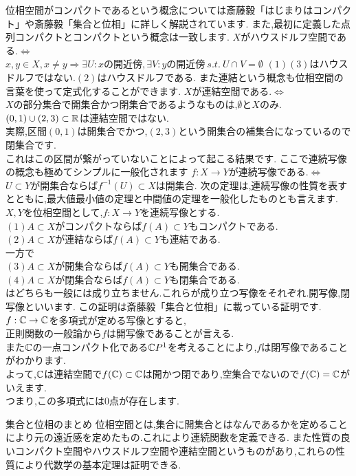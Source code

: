 位相空間がコンパクトであるという概念については斎藤毅「はじまりはコンパクト」や斎藤毅「集合と位相」に詳しく解説されています.
また,最初に定義した点列コンパクトとコンパクトという概念は一致します.
$X$がハウスドルフ空間である.$\iff$\\
$x,y \in X , x\neq y \Rightarrow \exists U:x\mbox{の開近傍} ,\exists V:y\mbox{の開近傍} \ s.t. \ U \cap V = \emptyset$
\ex
$(1)(3)$はハウスドルフではない.$(2)$はハウスドルフである.
\exx
また連結という概念も位相空間の言葉を使って定式化することができます.
$X$が連結空間である.$\iff$\\
$X$の部分集合で開集合かつ閉集合であるようなものは,$\emptyset$と$X$のみ.
\ex
$(0,1) \cup (2,3)\subset\mathbb R$は連結空間ではない.\\
実際,区間$(0,1)$は開集合でかつ,$(2,3)$という開集合の補集合になっているので閉集合です.\\
これはこの区間が繋がっていないことによって起こる結果です.
\exx
ここで連続写像の概念も極めてシンプルに一般化されます
$f:X\to Y$が連続写像である.$\iff$\\
$U \subset Y$が開集合ならば$f^{-1}(U) \subset X$は開集合.
次の定理は,連続写像の性質を表すとともに,最大値最小値の定理と中間値の定理を一般化したものとも言えます.
\thm
$X,Y$を位相空間として,$f:X\to Y$を連続写像とする.\\
$(1)$$A\subset X$がコンパクトならば$f(A)\subset Y$もコンパクトである.\\
$(2)$$A\subset X$が連結ならば$f(A)\subset Y$も連結である.\\
\thmx
\rem
一方で\\
$(3)A\subset X$が開集合ならば$f(A)\subset Y$も開集合である.\\
$(4)A\subset X$が閉集合ならば$f(A)\subset Y$も閉集合である.\\
はどちらも一般には成り立ちません.これらが成り立つ写像をそれぞれ.開写像,閉写像といいます.
\remx
\proof[位相空間論における代数学の基本定理の証明]
この証明は斎藤毅「集合と位相」に載っている証明です.\\
$f:\mathbb C \to \mathbb C$を多項式が定める写像とすると,\\
正則関数の一般論から$f$は開写像であることが言える.\\
また$\mathbb C$の一点コンパクト化である$\mathbb C P^1$を考えることにより,$f$は閉写像であることがわかります.\\
よって,$\mathbb C$は連結空間で$f(\mathbb C)\subset\mathbb C$は開かつ閉であり,空集合でないので$f(\mathbb C)=\mathbb C$がいえます.\\
つまり,この多項式には$0$点が存在します.
\proofx
\begin{itembox}[l]{集合と位相のまとめ}
位相空間とは,集合に開集合とはなんであるかを定めることにより元の遠近感を定めたもの.これにより連続関数を定義できる.
また性質の良いコンパクト空間やハウスドルフ空間や連結空間というものがあり,これらの性質により代数学の基本定理は証明できる.
\end{itembox}
